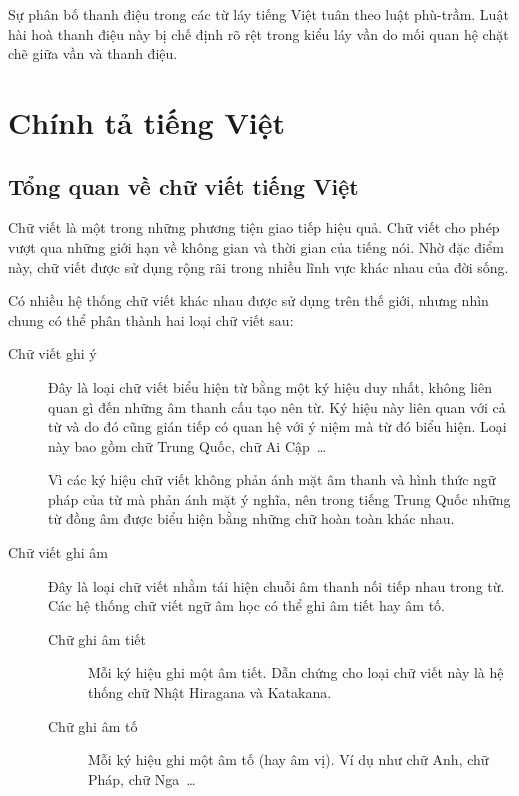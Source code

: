 \documentclass[a4paper,oneside,14pt]{extbook} %
\begin{document}
Sự phân bố thanh điệu trong các từ láy tiếng Việt tuân theo luật
phù-trầm. Luật hài hoà thanh điệu này bị chế định rõ rệt trong kiểu
láy vần do mối quan hệ chặt chẽ giữa vần và thanh điệu.



\section{Chính tả tiếng Việt}


\subsection{Tổng quan về chữ viết tiếng Việt}



Chữ viết là một trong những phương tiện giao tiếp hiệu quả. Chữ viết
cho phép vượt qua những giới hạn về không gian và thời gian của tiếng
nói. Nhờ đặc điểm này, chữ viết được sử dụng rộng rãi trong nhiều lĩnh
vực khác nhau của đời sống.

Có nhiều hệ thống chữ viết khác nhau được sử dụng trên thế giới, nhưng
nhìn chung có thể phân thành hai loại chữ viết sau:
\begin{description}
\item[Chữ viết ghi ý] Đây là loại chữ viết biểu hiện từ bằng một ký
  hiệu duy nhất, không liên quan gì đến những âm thanh cấu tạo nên
  từ. Ký hiệu này liên quan với cả từ và do đó cũng gián tiếp có quan
  hệ với ý niệm mà từ đó biểu hiện. Loại này bao gồm chữ Trung Quốc, chữ Ai
  Cập~\ldots{}

  Vì các ký hiệu chữ viết không phản ánh mặt âm thanh và hình thức ngữ
  pháp của từ mà phản ánh mặt ý nghĩa, nên trong tiếng Trung Quốc
  những từ đồng âm được biểu hiện bằng những chữ hoàn toàn khác nhau.

\item[Chữ viết ghi âm] Đây là loại chữ viết nhằm tái hiện chuỗi âm
  thanh nối tiếp nhau trong từ. Các hệ thống chữ viết ngữ âm học có
  thể ghi âm tiết hay âm tố.
  \begin{description}
  \item[Chữ ghi âm tiết] Mỗi ký hiệu ghi một âm tiết. Dẫn chứng cho
  loại chữ viết này là hệ thống chữ Nhật Hiragana và Katakana.

  \item[Chữ ghi âm tố] Mỗi ký hiệu ghi một âm tố (hay âm vị). Ví dụ
  như chữ Anh, chữ Pháp, chữ Nga~\ldots{}

  \end{description}
\end{description}
\end{document}
